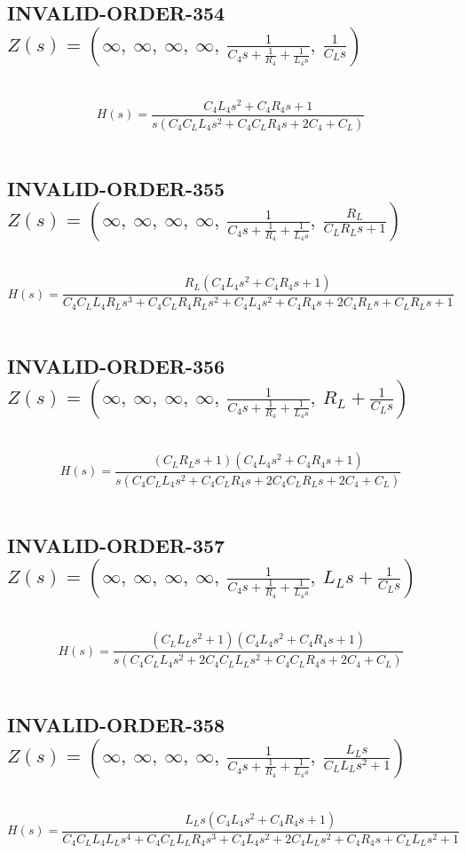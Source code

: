 \documentclass{article}
\begin{document}
\subsection{INVALID-ORDER-354 $Z(s) = \left( \infty, \  \infty, \  \infty, \  \infty, \  \frac{1}{C_{4} s + \frac{1}{R_{4}} + \frac{1}{L_{4} s}}, \  \frac{1}{C_{L} s}\right)$ } \ 
\textbf{\[H(s) = \frac{C_{4} L_{4} s^{2} + C_{4} R_{4} s + 1}{s \left(C_{4} C_{L} L_{4} s^{2} + C_{4} C_{L} R_{4} s + 2 C_{4} + C_{L}\right)}\] } \ 
\subsection{INVALID-ORDER-355 $Z(s) = \left( \infty, \  \infty, \  \infty, \  \infty, \  \frac{1}{C_{4} s + \frac{1}{R_{4}} + \frac{1}{L_{4} s}}, \  \frac{R_{L}}{C_{L} R_{L} s + 1}\right)$ } \ 
\textbf{\[H(s) = \frac{R_{L} \left(C_{4} L_{4} s^{2} + C_{4} R_{4} s + 1\right)}{C_{4} C_{L} L_{4} R_{L} s^{3} + C_{4} C_{L} R_{4} R_{L} s^{2} + C_{4} L_{4} s^{2} + C_{4} R_{4} s + 2 C_{4} R_{L} s + C_{L} R_{L} s + 1}\] } \ 
\subsection{INVALID-ORDER-356 $Z(s) = \left( \infty, \  \infty, \  \infty, \  \infty, \  \frac{1}{C_{4} s + \frac{1}{R_{4}} + \frac{1}{L_{4} s}}, \  R_{L} + \frac{1}{C_{L} s}\right)$ } \ 
\textbf{\[H(s) = \frac{\left(C_{L} R_{L} s + 1\right) \left(C_{4} L_{4} s^{2} + C_{4} R_{4} s + 1\right)}{s \left(C_{4} C_{L} L_{4} s^{2} + C_{4} C_{L} R_{4} s + 2 C_{4} C_{L} R_{L} s + 2 C_{4} + C_{L}\right)}\] } \ 
\subsection{INVALID-ORDER-357 $Z(s) = \left( \infty, \  \infty, \  \infty, \  \infty, \  \frac{1}{C_{4} s + \frac{1}{R_{4}} + \frac{1}{L_{4} s}}, \  L_{L} s + \frac{1}{C_{L} s}\right)$ } \ 
\textbf{\[H(s) = \frac{\left(C_{L} L_{L} s^{2} + 1\right) \left(C_{4} L_{4} s^{2} + C_{4} R_{4} s + 1\right)}{s \left(C_{4} C_{L} L_{4} s^{2} + 2 C_{4} C_{L} L_{L} s^{2} + C_{4} C_{L} R_{4} s + 2 C_{4} + C_{L}\right)}\] } \ 
\subsection{INVALID-ORDER-358 $Z(s) = \left( \infty, \  \infty, \  \infty, \  \infty, \  \frac{1}{C_{4} s + \frac{1}{R_{4}} + \frac{1}{L_{4} s}}, \  \frac{L_{L} s}{C_{L} L_{L} s^{2} + 1}\right)$ } \ 
\textbf{\[H(s) = \frac{L_{L} s \left(C_{4} L_{4} s^{2} + C_{4} R_{4} s + 1\right)}{C_{4} C_{L} L_{4} L_{L} s^{4} + C_{4} C_{L} L_{L} R_{4} s^{3} + C_{4} L_{4} s^{2} + 2 C_{4} L_{L} s^{2} + C_{4} R_{4} s + C_{L} L_{L} s^{2} + 1}\] } \ 
\end{document}

